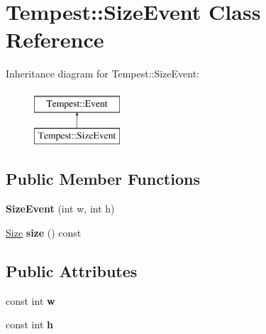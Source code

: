 \hypertarget{class_tempest_1_1_size_event}{\section{Tempest\+:\+:Size\+Event Class Reference}
\label{class_tempest_1_1_size_event}
}
Inheritance diagram for Tempest\+:\+:Size\+Event\+:\begin{figure}[H]
\begin{center}
\leavevmode
\includegraphics[height=2.000000cm]{class_tempest_1_1_size_event}
\end{center}
\end{figure}
\subsection*{Public Member Functions}
\begin{DoxyCompactItemize}
\item 
\hypertarget{class_tempest_1_1_size_event_aa79068ad8126d339f225bbefa37c9997}{{\bfseries Size\+Event} (int w, int h)}\label{class_tempest_1_1_size_event_aa79068ad8126d339f225bbefa37c9997}

\item 
\hypertarget{class_tempest_1_1_size_event_a0159bbbef1f6233de74d9f42cd00c6f3}{\hyperlink{struct_tempest_1_1_size}{Size} {\bfseries size} () const }\label{class_tempest_1_1_size_event_a0159bbbef1f6233de74d9f42cd00c6f3}

\end{DoxyCompactItemize}
\subsection*{Public Attributes}
\begin{DoxyCompactItemize}
\item 
\hypertarget{class_tempest_1_1_size_event_a24623b33ea5df2225e5070ce6e118982}{const int {\bfseries w}}\label{class_tempest_1_1_size_event_a24623b33ea5df2225e5070ce6e118982}

\item 
\hypertarget{class_tempest_1_1_size_event_a992bab532628dc20ad833b958eb1a955}{const int {\bfseries h}}\label{class_tempest_1_1_size_event_a992bab532628dc20ad833b958eb1a955}

\end{DoxyCompactItemize}
